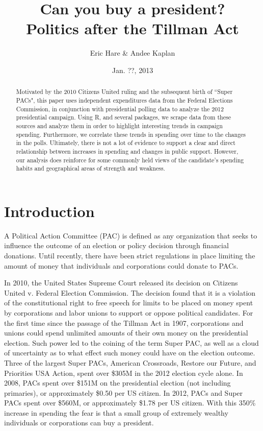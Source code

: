 \documentclass[11pt]{article}\usepackage{graphicx, color}
\begin{document}
\setlength{\parskip}{3ex}
\setlength{\parindent}{0pt}

\title{Can you buy a president? \\ \vspace{.6cm} \Large Politics after the Tillman Act}
\author{Eric Hare \& Andee Kaplan}
\date{Jan. ??, 2013}

\maketitle
\thispagestyle{empty}
\begin{abstract}
Motivated by the 2010 Citizens United ruling and the subsequent birth of ``Super PACs", this paper uses independent expenditures data from the Federal Elections Commission, in conjunction with presidential polling data to analyze the 2012 presidential campaign. Using R, and several packages, we scrape data from these sources and analyze them in order to highlight interesting trends in campaign spending. Furthermore, we correlate these trends in spending over time to the changes in the polls. Ultimately, there is not a lot of evidence to support a clear and direct relationship between increases in spending and changes in public support. However, our analysis does reinforce for some commonly held views of the candidate's spending habits and geographical areas of strength and weakness.
\end{abstract}
\clearpage

\setcounter{page}{1}
\section{Introduction}
A Political Action Committee (PAC) is defined as any organization that seeks to influence the outcome of an election or policy decision through financial donations. Until recently, there have been strict regulations in place limiting the amount of money that individuals and corporations could donate to PACs.

In 2010, the United States Supreme Court released its decision on Citizens United v. Federal Election Commission. The decision found that it is a violation of the constitutional right to free speech for limits to be placed on money spent by corporations and labor unions to support or oppose political candidates. For the first time since the passage of the Tillman Act in 1907, corporations and unions could spend unlimited amounts of their own money on the presidential election. Such power led to the coining of the term Super PAC, as well as a cloud of uncertainty as to what effect such money could have on the election outcome. Three of the largest Super PACs, American Crossroads, Restore our Future, and Priorities USA Action, spent over \$305M in the 2012 election cycle alone. In 2008, PACs spent over \$151M on the presidential election (not including primaries), or approximately \$0.50 per US citizen. In 2012, PACs and Super PACs spent over \$560M, or approximately \$1.78 per US citizen. With this 350\% increase in spending the fear is that a small group of extremely wealthy individuals or corporations can buy a president.
\end{document}
